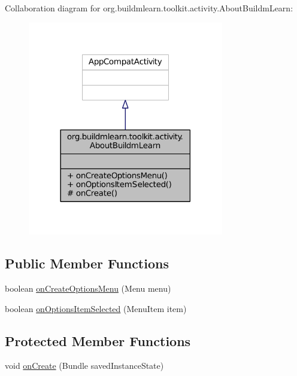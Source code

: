 Collaboration diagram for org.\-buildmlearn.\-toolkit.\-activity.\-About\-Buildm\-Learn\-:
\nopagebreak
\begin{figure}[H]
\begin{center}
\leavevmode
\includegraphics[width=242pt]{da/d3d/classorg_1_1buildmlearn_1_1toolkit_1_1activity_1_1AboutBuildmLearn__coll__graph}
\end{center}
\end{figure}
\subsection*{Public Member Functions}
\begin{DoxyCompactItemize}
\item 
boolean \hyperlink{classorg_1_1buildmlearn_1_1toolkit_1_1activity_1_1AboutBuildmLearn_aae36faad42229bef35356768eb2456ea}{on\-Create\-Options\-Menu} (Menu menu)
\item 
boolean \hyperlink{classorg_1_1buildmlearn_1_1toolkit_1_1activity_1_1AboutBuildmLearn_adb420eeaf2bf93bff38b52f19bc16b31}{on\-Options\-Item\-Selected} (Menu\-Item item)
\end{DoxyCompactItemize}
\subsection*{Protected Member Functions}
\begin{DoxyCompactItemize}
\item 
void \hyperlink{classorg_1_1buildmlearn_1_1toolkit_1_1activity_1_1AboutBuildmLearn_af8c59cecea3366aea895a28331d01e9b}{on\-Create} (Bundle saved\-Instance\-State)
\end{DoxyCompactItemize}


